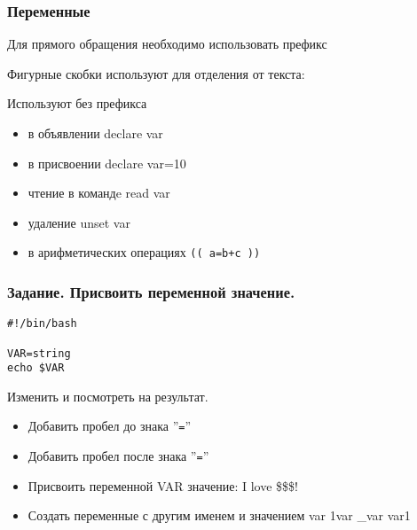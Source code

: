 

\begin{frame}
	\frametitle{Переменные}
	\large{}

	Для прямого обращения необходимо использовать префикс \\
	\center{\Large{\tt \$}}

	Фигурные скобки используют для отделения от текста:\\

	
	\begin{alertblock}{Используют без префикса}
		\begin{itemize}
			\item в объявлении declare var
			\item в присвоении declare var=10
			\item чтение в командe read var
			\item удаление unset var
			\item в арифметических операциях {\tt (( a=b+c ))}
		\end{itemize}
	\end{alertblock}
\end{frame}

\begin{frame}[fragile]
	\frametitle{Задание. Присвоить переменной значение.}

\begin{lstlisting}
#!/bin/bash

VAR=string
echo $VAR
\end{lstlisting}


	\begin{block}{Изменить и посмотреть на результат.}
		\begin{itemize}
			\item Добавить пробел до знака ''{\tt =}''
			\item Добавить пробел после знака ''{\tt =}''
			\item Присвоить переменной VAR значение: I love \$\$\$!
			\item Создать переменные с другим именем и значением var 1var \_var var1
		\end{itemize}
	\end{block}

\end{frame}

%
%
%


